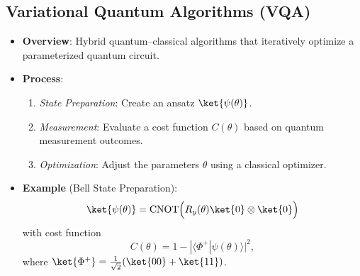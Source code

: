 \begin{multicols}{3}

    \section*{Variational Quantum Algorithms (VQA)}
    \begin{itemize}[leftmargin=*,nosep,topsep=0pt]
      \item \textbf{Overview}: Hybrid quantum–classical algorithms that
        iteratively optimize a parameterized quantum circuit.
      \item \textbf{Process}:
        \begin{enumerate}[nosep]
          \item \textit{State Preparation}: Create an ansatz $\ket{\psi(\theta)}$.
          \item \textit{Measurement}: Evaluate a cost function $C(\theta)$
            based on quantum measurement outcomes.
          \item \textit{Optimization}: Adjust the parameters $\theta$ using a
            classical optimizer.
        \end{enumerate}
      \item \textbf{Example} (Bell State Preparation):
        \[
          \ket{\psi(\theta)} = \mathrm{CNOT}\Bigl(R_y(\theta)\ket{0}\otimes\ket{0}\Bigr)
        \]
        with cost function
        \[
          C(\theta)=1-|\langle\Phi^+|\psi(\theta)\rangle|^2,
        \]
        where $\ket{\Phi^+}=\frac{1}{\sqrt{2}}(\ket{00}+\ket{11})$.
    \end{itemize}


\end{multicols}
